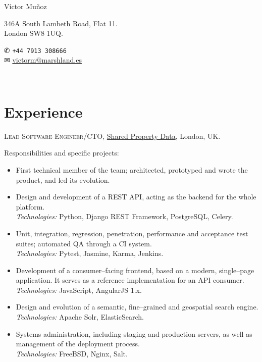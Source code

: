 \documentclass[11pt]{article}
\newcommand{\years}[1]{\marginnote{\scriptsize #1}}
\begin{document}
\begin{minipage}[m]{.3\textwidth}
	{\LARGE Víctor Muñoz}
\end{minipage}
\begin{minipage}[m]{.45\textwidth}
	346A South Lambeth Road, Flat 11.\\
	London SW8 1UQ.
\end{minipage}
\begin{minipage}[m]{.25\textwidth}
	{\dingbats ✆} \texttt{+44 7913 308666}\\
	{\dingbats ✉} \href{mailto:victorm@marshland.es}
	                    {victorm@marshland.es}
\end{minipage}\\[.05cm]


\section*{Experience}  %
\noindent

\years{2014--2017}\textsc{Lead Software Engineer/CTO}, \href{http://myspd.co.uk}{Shared Property Data}, London, UK.

Responsibilities and specific projects:
\begin{itemize}
	\item  First technical member of the team; architected, prototyped and wrote the product, and led its evolution.
	\item  Design and development of a REST API, acting as the backend for the whole platform.\\
	\textit{Technologies:} Python, Django REST Framework, PostgreSQL, Celery.
	\item  Unit, integration, regression, penetration, performance and acceptance test suites; automated QA through a CI system.\\
	\textit{Technologies:} Pytest, Jasmine, Karma, Jenkins.
	\item  Development of a consumer--facing frontend, based on a modern, single--page application. It serves as a reference implementation for an API consumer.\\
	\textit{Technologies:} JavaScript, AngularJS 1.x.
	\item  Design and evolution of a semantic, fine--grained and geospatial search engine. \\
	\textit{Technologies:} Apache Solr, ElasticSearch.
	\item  Systems administration, including staging and production servers, as well as management of the deployment process.\\
	\textit{Technologies:} FreeBSD, Nginx, Salt.
\end{itemize}
\end{document}

